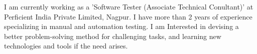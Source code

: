 

\begin{cvparagraph}

I am currently working as a 'Software Tester (Associate Technical Conultant)' at Perficient India Private Limited, Nagpur. I have more than 2 years of experience specializing in manual and automation testing. I am Interested in devising a better problem-solving method for challenging tasks, and learning new technologies and tools if the need arises. 
\end{cvparagraph}
